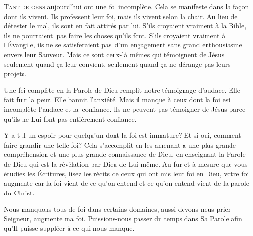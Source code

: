 


\lettrine{T}{ant de gens} aujourd'hui ont une foi incomplète.
 Cela se manifeste dans la fa\c{c}on dont ils vivent. Ils professent leur foi,
 mais ils vivent selon la chair. Au lieu de détester le mal,
 ils sont en fait attirés par lui. S'ils croyaient vraiment à la Bible,
 ils ne pourraient~pas faire les choses qu'ils font.
 S'ils croyaient vraiment à l'Évangile, ils ne se satisferaient pas~d'un
 engagement sans grand enthousiasme envers leur Sauveur.
 Mais ce sont ceux-là mêmes qui témoignent de Jésus seulement
 quand \c{c}a leur convient, seulement quand \c{c}a ne dérange pas leurs projets.


Une foi complète en la Parole de Dieu remplit notre témoignage d'audace.
 Elle fait fuir la peur. Elle bannit l'anxiété. Mais il manque à ceux
 dont la foi est incomplète l'audace et la~confiance.
 Ils ne peuvent pas témoigner de Jésus parce qu'ils ne Lui font pas
 entièrement confiance.

Y a-t-il  un espoir pour quelqu'un dont la foi est immature?
 Et si oui, comment faire grandir une telle foi? Cela s'accomplit
 en les amenant à une plus grande compréhension et une plus grande
 connaissance de Dieu, en enseignant la Parole de Dieu qui est la révélation
 par Dieu de Lui-même. Au fur et à mesure que vous étudiez les Écritures,
 lisez les récits de ceux qui ont mis leur foi en Dieu, votre foi augmente
 \ocadr car la foi vient de ce qu'on entend et ce qu'on entend vient
 de la parole du Christ.

Nous manquons tous de foi dans certains domaines, aussi devons-nous prier\frcolon{} 
 \Og Seigneur, augmente ma foi. \Fg{}
 Puissions-nous passer du temps dans Sa Parole afin qu'Il puisse
 suppléer à ce qui nous manque.

\dvrule



